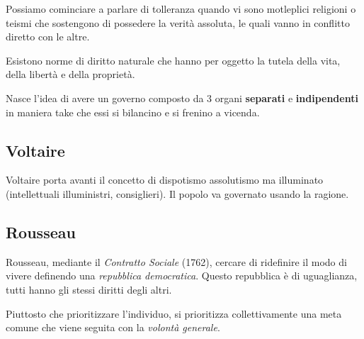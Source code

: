 \documentclass[a4paper]{article}
\begin{document}
Possiamo cominciare a parlare di tolleranza quando vi sono motleplici religioni o teismi che sostengono di possedere la verità assoluta, le quali vanno in conflitto diretto con le altre.

Esistono norme di diritto naturale che hanno per oggetto la tutela della vita, della libertà e della proprietà.

Nasce l'idea di avere un governo composto da 3 organi \textbf{separati}
e \textbf{indipendenti} in maniera take che essi si bilancino e si frenino a vicenda.

\subsection{Voltaire}


Voltaire porta avanti il concetto di dispotismo assolutismo ma illuminato (intellettuali illuministri, consiglieri).
Il popolo va governato usando la ragione.

\subsection{Rousseau}

Rousseau, mediante il \textit{Contratto Sociale} (1762),
cercare di ridefinire il modo di vivere definendo una \textit{repubblica democratica}.
Questo repubblica è di uguaglianza, tutti hanno gli stessi diritti degli altri.

Piuttosto che prioritizzare l'individuo, si prioritizza collettivamente una meta comune
che viene seguita con la \textit{volontà generale}.
\end{document}
